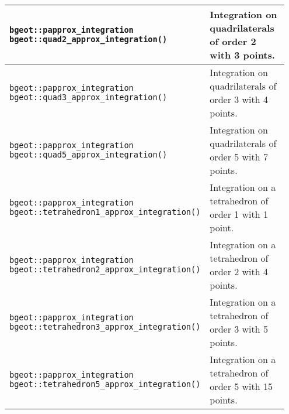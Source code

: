 \begin{center} \begin{tabular}{|m{0.55\linewidth}|m{0.4\linewidth}|} \hline

{\tt bgeot::papprox\_integration bgeot::quad2\_approx\_integration()} & Integration on quadrilaterals of order 2 with 3 points. \\ \hline

{\tt bgeot::papprox\_integration bgeot::quad3\_approx\_integration()} & Integration on quadrilaterals of order 3 with 4 points. \\ \hline

{\tt bgeot::papprox\_integration bgeot::quad5\_approx\_integration()} & Integration on quadrilaterals of order 5 with 7 points. \\ \hline

{\tt bgeot::papprox\_integration bgeot::tetrahedron1\_approx\_integration()} & Integration on a tetrahedron of order 1 with 1 point. \\ \hline

{\tt bgeot::papprox\_integration bgeot::tetrahedron2\_approx\_integration()} & Integration on a tetrahedron of order 2 with 4 points. \\ \hline

{\tt bgeot::papprox\_integration bgeot::tetrahedron3\_approx\_integration()} & Integration on a tetrahedron of order 3 with 5 points. \\ \hline

{\tt bgeot::papprox\_integration bgeot::tetrahedron5\_approx\_integration()} & Integration on a tetrahedron of order 5 with 15 points. \\ \hline

\end{tabular} \end{center}
